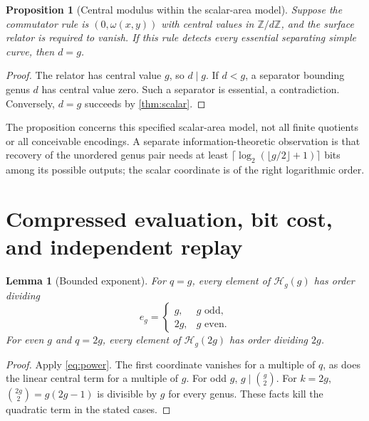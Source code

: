\documentclass[11pt,letterpaper]{article}
\newtheorem{proposition}[proposition]{Proposition}
\newtheorem{lemma}[lemma]{Lemma}
\theoremstyle{definition}
\theoremstyle{remark}
\newcommand{\Z}{\mathbb Z}
\newcommand{\HH}{\mathcal H}
\begin{document}
\begin{proposition}[Central modulus within the scalar-area model]\label{prop:centralminimal}
Suppose the commutator rule is $(0,\omega(x,y))$ with central values in $\Z/d\Z$, and the surface relator is required to vanish. If this rule detects every essential separating simple curve, then $d=g$.
\end{proposition}
\begin{proof}
The relator has central value $g$, so $d\mid g$. If $d<g$, a separator bounding genus $d$ has central value zero. Such a separator is essential, a contradiction. Conversely, $d=g$ succeeds by \cref{thm:scalar}.
\end{proof}
The proposition concerns this specified scalar-area model, not all finite quotients or all conceivable encodings. A separate information-theoretic observation is that recovery of the unordered genus pair needs at least $\lceil\log_2(\lfloor g/2\rfloor+1)\rceil$ bits among its possible outputs; the scalar coordinate is of the right logarithmic order.

\section{Compressed evaluation, bit cost, and independent replay}
\label{sec:compiler}
\begin{lemma}[Bounded exponent]\label{lem:exponent}
For $q=g$, every element of $\HH_g(g)$ has order dividing
\[
 e_g=\begin{cases}g,&g\text{ odd},\\2g,&g\text{ even}.\end{cases}
\]
For even $g$ and $q=2g$, every element of $\HH_g(2g)$ has order dividing $2g$.
\end{lemma}
\begin{proof}
Apply \eqref{eq:power}. The first coordinate vanishes for a multiple of $q$, as does the linear central term for a multiple of $g$. For odd $g$, $g\mid\binom g2$. For $k=2g$, $\binom{2g}{2}=g(2g-1)$ is divisible by $g$ for every genus. These facts kill the quadratic term in the stated cases.
\end{proof}
\end{document}
